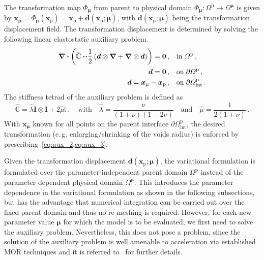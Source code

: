 \documentclass[a4paper]{eccomas_paper-2024}
\makeatletter
\newcommand{\eg}{e.\,g.\@\xspace}
\makeatother
\begin{document}
The transformation map $\Phi_{\bm\mu}$ from parent to physical domain $\Phi_{\bm\mu}: \varOmega^{\mathrm{p}}\mapsto\varOmega^{\bm\mu}$ is given by $\bm{x}_{\bm\mu}=\Phi_{\bm\mu}(\bm{x}_{\mathrm{p}}) = \bm{x}_{\mathrm{p}} + \bm{d}(\bm{x}_{\mathrm{p}}; \bm\mu)$, 
with $\bm{d}(\bm{x}_{\mathrm{p}}; \bm{\mu})$ being the transformation displacement field.
The transformation displacement is determined by solving the following linear elastostatic auxiliary problem.
\begin{align}
    \label{eq:aux_1}\div{\left(\hat{\mathbb{C}}\vdot\!\vdot\frac{1}{2}\left(
            \bm{d}\otimes\grad + \grad\otimes\bm{d}
\right)\right)}
            = \bm{0}\,,\quad&\mathrm{in}\;\varOmega^{\mathrm{p}}\,,\\
    \label{eq:aux_2}\bm{d} = \bm{0}\,,\quad&\mathrm{on}\;\partial\varOmega^{\mathrm{p}}\,,\\
    \label{eq:aux_3}\bm{d} = \bm{x}_{\mu} - \bm{x}_{\mathrm{p}}\,,\quad&\mathrm{on}\;\partial\varOmega^{\mathrm{p}}_{\mathrm{int}}\,.
\end{align}
The stiffness tetrad of the auxiliary problem is defined as
\begin{equation}
    \hat{\mathbb{C}} = \hat{\lambda} \bm{I}\otimes\bm{I} + 2\hat{\mu}\mathbb{I}\,,\quad\mathrm{with}\quad \hat{\lambda}=\frac{\nu}{(1+\nu)(1-2\nu)}\quad\mathrm{and}\quad\hat{\mu}=\frac{1}{2(1+\nu)}\,.
    \label{eq:aux_tetrad}
\end{equation}
With $\bm{x}_{\bm\mu}$ known for all points on the parent interface $\partial\varOmega^{\mathrm{p}}_{\mathrm{int}}$, the desired transformation (\eg{} enlarging/shrinking of the voids radius) is enforced by prescribing~\cref{eq:aux_2,eq:aux_3}.

Given the transformation displacement $\bm{d}(\bm{x}_{\mathrm{p}};\bm\mu)$, the variational formulation is formulated over the parameter-independent parent domain $\varOmega^{\mathrm{p}}$ instead of the parameter-dependent physical domain $\varOmega^{\bm\mu}$.
This introduces the parameter dependence in the variational formulation as shown in the following subsections, but has the advantage that numerical integration can be carried out over the fixed parent domain and thus no re-meshing is required.
However, for each new parameter value $\bm\mu$ for which the model is to be evaluated, we first need to solve the auxiliary problem.
Nevertheless, this does not pose a problem, since the solution of the auxiliary problem is well amenable to acceleration via established MOR techniques and it is referred to~\cite{Guo2022Learning} for further details.
\end{document}
